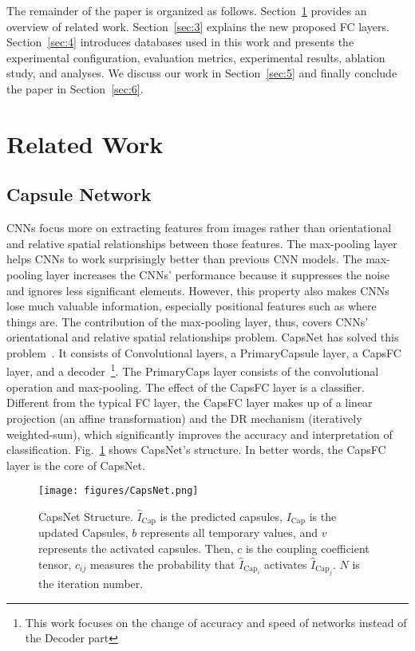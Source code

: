 \documentclass[sn-mathphys,iicol,Numbered]{sn-jnl}
\begin{document}
The remainder of the paper is organized as follows. Section~\ref{sec:2} provides an overview of related work. Section~\ref{sec:3} explains the new proposed FC layers. Section~\ref{sec:4} introduces databases used in this work and presents the experimental configuration, evaluation metrics, experimental results, ablation study, and analyses. We discuss our work in Section~\ref{sec:5} and finally conclude the paper in Section~\ref{sec:6}.

\section{Related Work} \label{sec:2}
\subsection{Capsule Network} \label{sec:2.1}

CNNs focus more on extracting features from images rather than orientational and relative spatial relationships between those features. The max-pooling layer helps CNNs to work surprisingly better than previous CNN models. The max-pooling layer increases the CNNs' performance because it suppresses the noise and ignores less significant elements. However, this property also makes CNNs lose much valuable information, especially positional features such as where things are. The contribution of the max-pooling layer, thus, covers CNNs' orientational and relative spatial relationships problem. CapsNet has solved this problem~\cite{A1_caps}. It consists of Convolutional layers, a PrimaryCapsule layer, a CapsFC layer, and a decoder~\footnote{This work focuses on the change of accuracy and speed of networks instead of the Decoder part}. The PrimaryCaps layer consists of the convolutional operation and max-pooling. The effect of the CapsFC layer is a classifier. Different from the typical FC layer, the CapsFC layer makes up of a linear projection (an affine transformation) and the DR mechanism (iteratively weighted-sum), which significantly improves the accuracy and interpretation of classification. Fig.~\ref{fig:capsnet} shows CapsNet's structure. In better words, the CapsFC layer is the core of CapsNet.

\begin{figure} [ht]
\centering
\caption{CapsNet Structure. $\hat{I}_{\text{Cap}}$ is the predicted capsules, $I_{\text{Cap}}$ is the updated Capsules, $b$ represents all temporary values, and $v$ represents the activated capsules. Then, $c$ is the coupling coefficient tensor, $c_{ij}$ measures the probability that $\hat{I}_{\text{Cap}_{i}}$ activates $\hat{I}_{\text{Cap}_{j}}$. $N$ is the iteration number.}
\vspace{0.2cm}
\texttt{[image: figures/CapsNet.png]}
\label{fig:capsnet}
\vspace{-0.3cm}
\end{figure}
\end{document}
